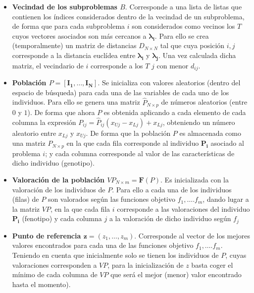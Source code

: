 \begin{itemize}

\item \textbf{Vecindad de los subproblemas $B$}. Corresponde a una lista de listas que contienen los índices considerados dentro de la vecindad de un subproblema, de forma que para cada subproblema $i$ son considerados como vecinos los $T$ cuyos vectores asociados son más cercanos a $\boldsymbol{\lambda_i}$. Para ello se crea (temporalmente) un matriz de distancias $D_{N \times N}$ tal que cuya posición $i,j$ corresponde a la distancia euclídea entre $\boldsymbol{\lambda_i}$ y $\boldsymbol{\lambda_j}$. Una vez calculada dicha matriz, el vecindario de $i$ corresponde a los $T$ $j$ con menor $d_{ij}$.\\

\item \textbf{Población $P = [\boldsymbol{I_1}, \dots, \boldsymbol{I_N}]$}. Se inicializa con valores aleatorios (dentro del espacio de búsqueda) para cada una de las variables de cada uno de los individuos. Para ello se genera una matriz $\hat{P}_{N \times p}$ de números aleatorios (entre $0$ y $1$). De forma que ahora $P$ es obtenida aplicando a cada elemento de cada columna la expresión $P_{ij}=\hat{P}_{ij} \left(x_{Uj} - x_{Lj}\right) + x_{Lj}$, obteniendo un número aleatorio entre $x_{Lj}$ y $x_{Uj}$. De forma que la población $P$ es almacenada como una matriz $P_{N \times p}$ en la que cada fila corresponde al individuo $\boldsymbol{P_i}$ asociado al problema $i$; y cada columna corresponde al valor de las características de dicho individuo (genotipo).\\

\item \textbf{Valoración de la población $VP_{N \times m} = \boldsymbol{F}(P)$}. Es inicializada con la valoración de los individuos de $P$. Para ello a cada una de los individuos (filas) de $P$ son valorados según las funciones objetivo $f_1, \dots. f_m$, dando lugar a la matriz $VP$, en la que cada fila $i$ corresponde a las valoraciones del individuo $\boldsymbol{P_i}$ (fenotipo) y cada columna $j$ a la valoración de dicho individuo según $f_j$\\ 

\item \textbf{Punto de referencia $\boldsymbol{z} = (z_1, \dots, z_m)$}. Corresponde al vector de los mejores valores encontrados para cada una de las funciones objetivo $f_1, \dots. f_m$. Teniendo en cuenta que inicialmente solo se tienen los individuos de $P$, cuyas valoraciones corresponden a $VP$, para la inicialización de $z$ basta coger el mínimo de cada columna de $VP$ que será el mejor (menor) valor encontrado hasta el momento).\\


\end{itemize}
